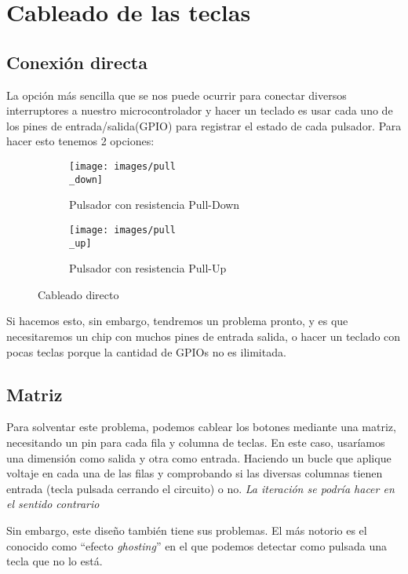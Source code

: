 \section{Cableado de las teclas}
    \subsection{Conexión directa}
    La opción más sencilla que se nos puede ocurrir para conectar diversos interruptores a nuestro microcontrolador y hacer un teclado es usar cada uno de los pines de entrada/salida(GPIO) para registrar el estado de cada pulsador. Para hacer esto tenemos 2 opciones:
    \begin{figure}[H]
        \begin{subfigure}[b]{.5\textwidth}
          \centering
          \texttt{[image: images/pull\\\_down]}
          \caption{Pulsador con resistencia Pull-Down}
        \end{subfigure} 
        \hfill
        \begin{subfigure}[b]{.5\textwidth}
          \centering
          \texttt{[image: images/pull\\\_up]}
          \caption{Pulsador con resistencia Pull-Up}
        \end{subfigure}
        \caption{Cableado directo}
      \end{figure}
    
    Si hacemos esto, sin embargo, tendremos un problema pronto, y es que necesitaremos un chip con muchos pines de entrada salida, o hacer un teclado con pocas teclas porque la cantidad de GPIOs no es ilimitada.

    \subsection{Matriz}
    Para solventar este problema, podemos cablear los botones mediante una matriz, necesitando un pin para cada fila y columna de teclas. En este caso, usaríamos una dimensión como salida y otra como entrada. Haciendo un bucle que aplique voltaje en cada una de las filas y comprobando si las diversas columnas tienen entrada (tecla pulsada cerrando el circuito) o no. \textit{La iteración se podría hacer en el sentido contrario}

    Sin embargo, este diseño también tiene sus problemas. El más notorio es el conocido como ``efecto \textit{ghosting}'' en el que podemos detectar como pulsada una tecla que no lo está.

